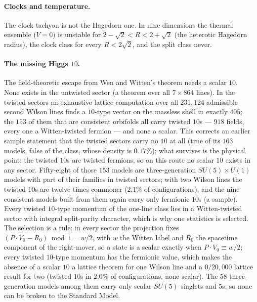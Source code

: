 \paragraph{Clocks and temperature.} The clock tachyon is not the Hagedorn one. In nine dimensions the thermal ensemble ($V=0$)
is unstable for $2-\sqrt2<R<2+\sqrt2$ (the heterotic Hagedorn radius), the clock class for every $R<2\sqrt2$, and the split
class never. 

\paragraph{The missing Higgs $10$.} The field-theoretic escape from Wen and Witten's theorem needs a scalar $10$. None exists in
the untwisted sector (a theorem over all $7\times864$ lines). In the twisted sectors an exhaustive lattice computation over all
$231{,}124$ admissible second Wilson lines finds a $10$-type vector on the massless shell in exactly $405$; the $153$ of them that are
consistent orbifolds all carry twisted $10$s --- $918$ fields, every one a Witten-twisted fermion --- and none a scalar. This corrects
an earlier sample statement that the twisted sectors carry no $10$ at all (true of its $163$ models, false of the class, whose
density is $0.17\%$); what survives is the physical point: the twisted $10$s are twisted fermions, so on this route no scalar $10$
exists in any sector. Fifty-eight of those $153$ models are three-generation $SU(5)\times U(1)$ models with part of their
families in twisted sectors; with two Wilson lines the twisted $10$s are twelve times commoner ($2.1\%$ of configurations),
and the nine consistent models built from them again carry only fermionic $10$s (a sample). Every twisted $10$-type momentum of the
one-line class lies in a Witten-twisted sector with integral split-parity character, which is why one statistics is selected.  The selection is a rule: in every sector the projection fixes $(P\cdot V_0-R_0)\bmod1=w/2$, with $w$ the Witten label and $R_0$
the spacetime component of the right-mover, so a state is a scalar exactly when $P\cdot V_0\equiv w/2$; every twisted $10$-type momentum
has the fermionic value, which makes the absence of a scalar $10$ a lattice theorem for one Wilson line and a $0/20{,}000$ lattice result
for two (twisted $10$s in $2.0\%$ of configurations, none scalar). The $58$ three-generation models among them carry only scalar
$SU(5)$ singlets and $5$s, so none can be broken to the Standard Model.    

